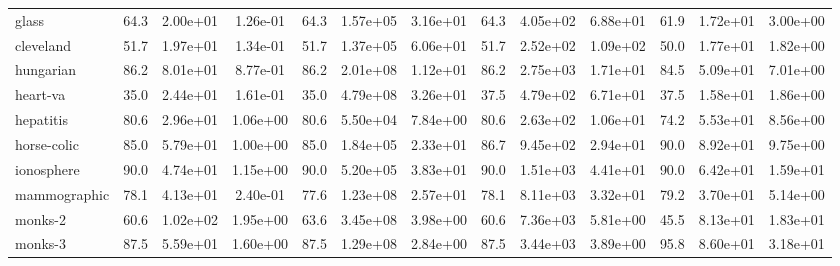 \begin{table}[t]
\begin{tabular}{lcccccccccccc}
			glass            & 64.3                        & 2.00e+01                         & 1.26e-01                           & 64.3                       & 1.57e+05 & 3.16e+01 & 64.3  & 4.05e+02 & 6.88e+01 & 61.9  & 1.72e+01 & 3.00e+00 \\
			cleveland        & 51.7                        & 1.97e+01                         & 1.34e-01                           & 51.7                       & 1.37e+05 & 6.06e+01 & 51.7  & 2.52e+02 & 1.09e+02 & 50.0  & 1.77e+01 & 1.82e+00 \\
			hungarian        & 86.2                        & 8.01e+01                         & 8.77e-01                           & 86.2                       & 2.01e+08 & 1.12e+01 & 86.2  & 2.75e+03 & 1.71e+01 & 84.5  & 5.09e+01 & 7.01e+00 \\
			heart-va         & 35.0                        & 2.44e+01                         & 1.61e-01                           & 35.0                       & 4.79e+08 & 3.26e+01 & 37.5  & 4.79e+02 & 6.71e+01 & 37.5  & 1.58e+01 & 1.86e+00 \\
			hepatitis        & 80.6                        & 2.96e+01                         & 1.06e+00                           & 80.6                       & 5.50e+04 & 7.84e+00 & 80.6  & 2.63e+02 & 1.06e+01 & 74.2  & 5.53e+01 & 8.56e+00 \\
			horse-colic      & 85.0                        & 5.79e+01                         & 1.00e+00                           & 85.0                       & 1.84e+05 & 2.33e+01 & 86.7  & 9.45e+02 & 2.94e+01 & 90.0  & 8.92e+01 & 9.75e+00 \\
			ionosphere       & 90.0                        & 4.74e+01                         & 1.15e+00                           & 90.0                       & 5.20e+05 & 3.83e+01 & 90.0  & 1.51e+03 & 4.41e+01 & 90.0  & 6.42e+01 & 1.59e+01 \\
			mammographic     & 78.1                        & 4.13e+01                         & 2.40e-01                           & 77.6                       & 1.23e+08 & 2.57e+01 & 78.1  & 8.11e+03 & 3.32e+01 & 79.2  & 3.70e+01 & 5.14e+00 \\
			monks-2          & 60.6                        & 1.02e+02                         & 1.95e+00                           & 63.6                       & 3.45e+08 & 3.98e+00 & 60.6  & 7.36e+03 & 5.81e+00 & 45.5  & 8.13e+01 & 1.83e+01 \\
			monks-3          & 87.5                        & 5.59e+01                         & 1.60e+00                           & 87.5                       & 1.29e+08 & 2.84e+00 & 87.5  & 3.44e+03 & 3.89e+00 & 95.8  & 8.60e+01 & 3.18e+01 \\

\end{tabular}
\end{table}
